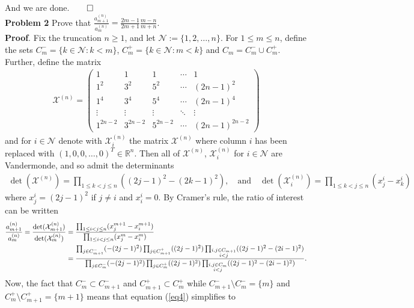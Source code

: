 \documentclass[10pt]{article}
\newcommand{\mbb}[1]{\mathbb{#1}}
\newcommand{\1}[1]{\mathbbm{1}_{#1}}
\newcommand{\mc}[1]{\mathcal{#1}}
\begin{document}
    And we are done.\hfill{$\qed$}\\[5pt]
    {\bf Problem 2} Prove that $\tfrac{a^{(n)}_{m+1}}{a^{(n)}_m}=\frac{2m-1}{2m+1}\frac{m-n}{m+n}$.\\[5pt]
    {\bf Proof}. Fix the truncation $n\geq 1$, and let $\mc{N}:=\{1,2,\dots,n\}$. For $1\leq m\leq n$, define the sets $C_m^-=\{k\in\mc{N}:k<m\}$, $C_m^+=\{k\in\mc{N}:m<k\}$
    and $C_m=C_m^-\cup C_m^+$. Further, define the matrix
    \begin{align*}
        \mc{X}^{(n)}=\begin{pmatrix}
            1 & 1 & 1 & \cdots & 1\\
            1^2 & 3^2 & 5^2 & \cdots & (2n-1)^2\\
            1^4 & 3^4 & 5^4 & \cdots & (2n-1)^4\\
            \vdots & \vdots & \vdots& \ddots & \vdots\\
            1^{2n-2} & 3^{2n-2} & 5^{2n-2} & \cdots & (2n-1)^{2n-2} 
        \end{pmatrix}
    \end{align*}
    and for $i\in\mc{N}$ denote with $\mc{X}^{(n)}_i$ the matrix $\mc{X}^{(n)}$ where column $i$ has been replaced with $(1,0,0,\dots,0)^T\in\mbb{R}^n$. Then all of $\mc{X}^{(n)}$, $\mc{X}^{(n)}_i$ for $i\in\mc{N}$ are
    Vandermonde, and so admit the determinants
    \begin{align*}
        \det(\mc{X}^{(n)})=\prod_{1\leq k<j\leq n}((2j-1)^2-(2k-1)^2),\quad\text{and}\quad\det(\mc{X}_i^{(n)})=\prod_{1\leq k<j\leq n}(x^i_j-x^i_k)
    \end{align*}
    where $x_j^i=(2j-1)^2$ if $j\neq i$ and $x_i^i=0$. By Cramer's rule, the ratio of interest can be written
    \begin{align}
        \frac{a^{(n)}_{m+1}}{a^{(n)}_m}=\frac{\det(\mc{X}^{(n)}_{m+1})}{\det(\mc{X}^{(n)}_m)}&=\frac{\prod_{1\leq i<j\leq n}(x_j^{m+1}-x_i^{m+1})}{\prod_{1\leq i<j\leq n}(x_j^{m}-x_i^{m})}\notag\\
        &=\frac{\prod_{j\in C_{m+1}^-}(-(2j-1)^2)\prod_{j\in C_{m+1}^+}((2j-1)^2)\prod_{\substack{i,j\in C_{m+1} \\ i<j}}((2j-1)^2-(2i-1)^2)}{\prod_{j\in C_{m}^-}(-(2j-1)^2)\prod_{j\in C_{m}^+}((2j-1)^2)\prod_{\substack{i,j\in C_{m} \\ i<j}}((2j-1)^2-(2i-1)^2)}.\label{eq4}
    \end{align}
    Now, the fact that $C_m^-\subset C_{m+1}^-$ and $C_{m+1}^+\subset C_m^+$ while $C_{m+1}^-\setminus C_{m}^-=\{m\}$ and $C_m^+\setminus C_{m+1}^+=\{m+1\}$ means that equation (\ref{eq4}) simplifies to
\end{document}
